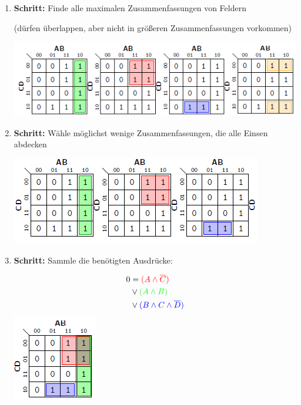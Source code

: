 \documentclass[12pt]{report}
\begin{document}
\begin{enumerate}
  \item \textbf{Schritt:}
        Finde alle maximalen Zusammenfassungen von Feldern
        
        (dürfen überlappen, aber nicht in größeren Zusammenfassungen vorkommen)
        
        \begin{center}
          \includegraphics[scale=1]{graphics/karnaugh-veitch-step_01}
        \end{center}
        
        
  \item \textbf{Schritt:}
        Wähle möglichst wenige Zusammenfassungen, die alle Einsen abdecken
        
        \begin{center}
          \includegraphics[scale=1]{graphics/karnaugh-veitch-step_02}
        \end{center}
        
        
  \item \textbf{Schritt:}
        Sammle die benötigten Ausdrücke:
        \begin{multicols}{2}
          \begin{align*}
            0 & = \color{red}{(A \wedge \overline{C})}              \\
              & \vee \color{green}{(A \wedge B)}                    \\
              & \vee \color{blue}{(B \wedge C \wedge \overline{D})}
          \end{align*}
          \columnbreak
          \includegraphics[scale=1]{graphics/karnaugh-veitch-step_03}
        \end{multicols}
\end{enumerate}
\end{document}

